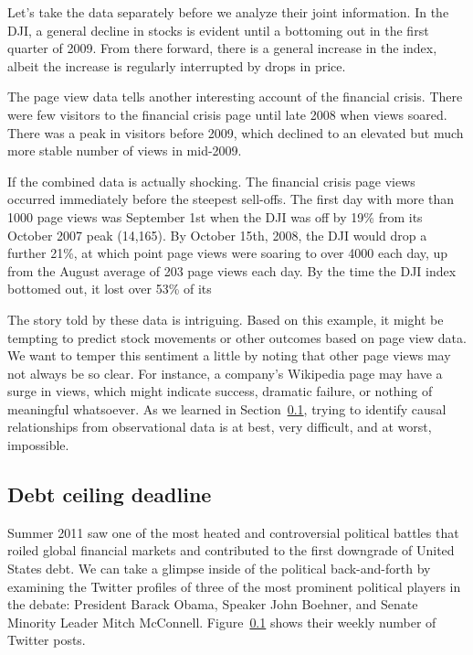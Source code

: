 Let's take the data separately before we analyze their joint information. In the DJI, a general decline in stocks is evident until a bottoming out in the first quarter of 2009. From there forward, there is a general increase in the index, albeit the increase is regularly interrupted by drops in price.

The page view data tells another interesting account of the financial crisis. There were few visitors to the financial crisis page until late 2008 when views soared. There was a peak in visitors before 2009, which declined to an elevated but much more stable number of views in mid-2009.

If the combined data is actually shocking. The financial crisis page views occurred immediately before the steepest sell-offs. The first day with more than 1000 page views was September 1st when the DJI was off by 19\% from its October 2007 peak (14,165). By October 15th, 2008, the DJI would drop a further 21\%, at which point page views were soaring to over 4000 each day, up from the August average of 203 page views each day. By the time the DJI index bottomed out, it lost over 53\% of its

The story told by these data is intriguing. Based on this example, it might be tempting to predict stock movements or other outcomes based on page view data. We want to temper this sentiment a little by noting that other page views may not always be so clear. For instance, a company's Wikipedia page may have a surge in views, which might indicate success, dramatic failure, or nothing of meaningful whatsoever. As we learned in Section~\ref{}, trying to identify causal relationships from observational data is at best, very difficult, and at worst, impossible.



\subsection{Debt ceiling deadline}

Summer 2011 saw one of the most heated and controversial political battles that roiled global financial markets and contributed to the first downgrade of United States debt. We can take a glimpse inside of the political back-and-forth by examining the Twitter profiles of three of the most prominent political players in the debate: President Barack Obama, Speaker John Boehner, and Senate Minority Leader Mitch McConnell. Figure~\ref{} shows their weekly number of Twitter posts.



